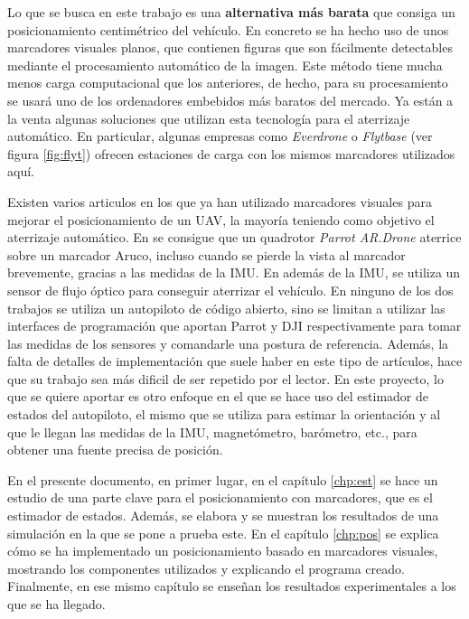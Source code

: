 Lo que se busca en este trabajo es una \textbf{alternativa más barata} que consiga un posicionamiento centimétrico del vehículo. En concreto se ha hecho uso de unos marcadores visuales planos, que contienen figuras que son fácilmente detectables mediante el procesamiento automático de la imagen. Este método tiene mucha menos carga computacional que los anteriores, de hecho, para su procesamiento se usará uno de los ordenadores embebidos más baratos del mercado.
Ya están a la venta algunas soluciones que utilizan esta tecnología para el aterrizaje automático. En particular, algunas  empresas como \textit{Everdrone} \cite{everdrone} o \textit{Flytbase} (ver figura \ref{fig:flyt}) ofrecen estaciones de carga con los mismos marcadores utilizados aquí. 

Existen varios articulos en los que ya han utilizado marcadores visuales para mejorar el posicionamiento de un UAV, la mayoría teniendo como objetivo el aterrizaje automático. En \cite{sani2017automatic} se consigue que un quadrotor \textit{Parrot AR.Drone} aterrice sobre un marcador Aruco, incluso cuando se pierde la vista al marcador brevemente, gracias a las medidas de la IMU. En \cite{yang2015precise} además de la IMU, se utiliza un sensor de flujo óptico para conseguir aterrizar el vehículo. En ninguno de los dos trabajos se utiliza un autopiloto de código abierto, sino se limitan a utilizar las interfaces de programación que aportan Parrot y DJI respectivamente para tomar las medidas de los sensores y comandarle una postura de referencia. 
Además, la falta de detalles de implementación que suele haber en este tipo de artículos, hace que su trabajo sea más dificil de ser repetido por el lector.
En este proyecto, lo que se quiere aportar es otro enfoque en el que se hace uso del estimador de estados del autopiloto, el mismo que se utiliza para estimar la orientación y al que le llegan las medidas de la IMU, magnetómetro, barómetro, etc., para obtener una fuente precisa de posición.  

En el presente documento, en primer lugar, en el capítulo \ref{chp:est} se hace un estudio de una parte clave para el posicionamiento con marcadores, que es el estimador de estados. Además, se elabora y se muestran los resultados de una simulación en la que se pone a prueba este. En el capítulo \ref{chp:pos} se explica cómo se ha implementado un posicionamiento basado en marcadores visuales, mostrando los componentes utilizados y explicando el programa creado. Finalmente, en ese mismo capítulo se enseñan los resultados experimentales a los que se ha llegado.  




\endinput
